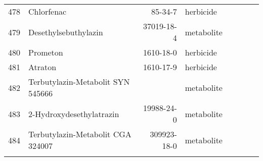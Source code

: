 \begin{longtable}{lp{4cm}rlp{1cm}p{1.5cm}p{1.5cm}p{1cm}}
  478 & Chlorfenac & 85-34-7 & herbicide &  &  &  &  \\ 
  479 & Desethylsebuthylazin & 37019-18-4 & metabolite &  &  &  &  \\ 
  480 & Prometon & 1610-18-0 & herbicide &  &  &  &  \\ 
  481 & Atraton & 1610-17-9 & herbicide &  &  &  &  \\ 
  482 & Terbutylazin-Metabolit SYN 545666 &  & metabolite &  &  &  &  \\ 
  483 & 2-Hydroxydesethylatrazin & 19988-24-0 & metabolite &  &  &  &  \\ 
  484 & Terbutylazin-Metabolit CGA 324007 & 309923-18-0 & metabolite &  &  &  &  \\ 
  \label{tab:phch_var}
\end{longtable}
\endgroup
